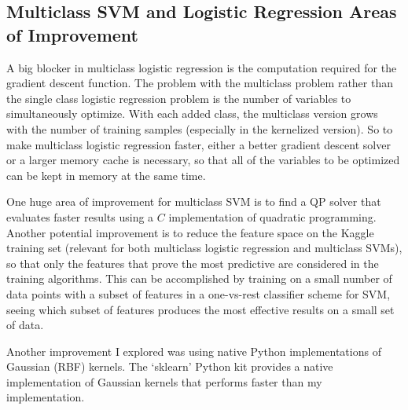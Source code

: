 \documentclass[10pt]{article}
\begin{document}
\subsection{Multiclass SVM and Logistic Regression Areas of Improvement}
\label{sec:improvement}

A big blocker in multiclass logistic regression is the computation required for the gradient descent function. The problem with the multiclass problem rather than the single class logistic regression problem is the number of variables to simultaneously optimize. With each added class, the multiclass version grows with the number of training samples (especially in the kernelized version). So to make multiclass logistic regression faster, either a better gradient descent solver or a larger memory cache is necessary, so that all of the variables to be optimized can be kept in memory at the same time.

One huge area of improvement for multiclass SVM is to find a QP solver that evaluates faster results using a $C$ implementation of quadratic programming. Another potential improvement is to reduce the feature space on the Kaggle training set (relevant for both multiclass logistic regression and multiclass SVMs), so that only the features that prove the most predictive are considered in the training algorithms. This can be accomplished by training on a small number of data points with a subset of features in a one-vs-rest classifier scheme for SVM, seeing which subset of features produces the most effective results on a small set of data.

Another improvement I explored was using native Python implementations of Gaussian (RBF) kernels. The `sklearn' Python kit provides a native implementation of Gaussian kernels that performs faster than my implementation.
\end{document}
